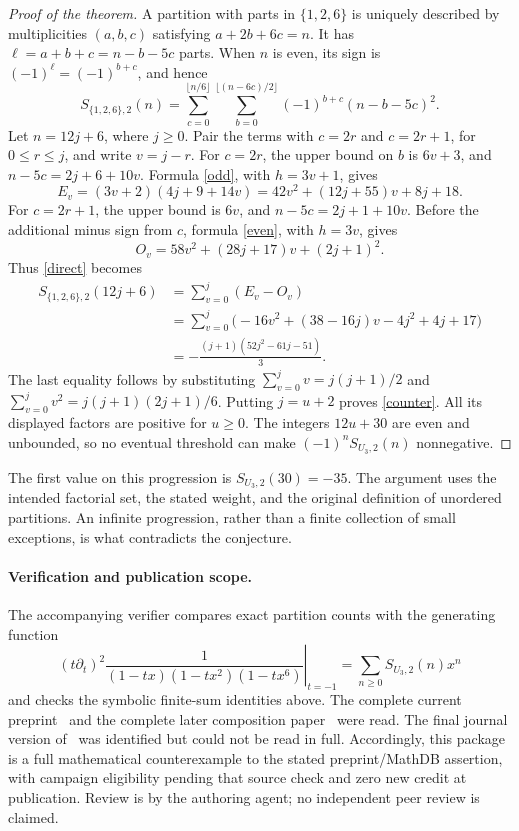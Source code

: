 \documentclass[11pt]{article}
\begin{document}
\begin{proof}[Proof of the theorem]
A partition with parts in $\{1,2,6\}$ is uniquely described by
multiplicities $(a,b,c)$ satisfying $a+2b+6c=n$. It has
$\ell=a+b+c=n-b-5c$ parts. When $n$ is even, its sign is
$(-1)^\ell=(-1)^{b+c}$, and hence
\begin{equation}\label{direct}
 S_{\{1,2,6\},2}(n)
 =\sum_{c=0}^{\lfloor n/6\rfloor}
   \sum_{b=0}^{\lfloor(n-6c)/2\rfloor}
    (-1)^{b+c}(n-b-5c)^2.
\end{equation}
Let $n=12j+6$, where $j\geq0$. Pair the terms with
$c=2r$ and $c=2r+1$, for $0\leq r\leq j$, and write $v=j-r$.
For $c=2r$, the upper bound on $b$ is $6v+3$, and
$n-5c=2j+6+10v$. Formula \eqref{odd}, with $h=3v+1$, gives
\[
 E_v=(3v+2)(4j+9+14v)
     =42v^2+(12j+55)v+8j+18.
\]
For $c=2r+1$, the upper bound is $6v$, and
$n-5c=2j+1+10v$. Before the additional minus sign from $c$,
formula \eqref{even}, with $h=3v$, gives
\[
 O_v=58v^2+(28j+17)v+(2j+1)^2.
\]
Thus \eqref{direct} becomes
\begin{align*}
 S_{\{1,2,6\},2}(12j+6)
 &=\sum_{v=0}^j(E_v-O_v)\\
 &=\sum_{v=0}^j
   \bigl(-16v^2+(38-16j)v-4j^2+4j+17\bigr)\\
 &=-\frac{(j+1)(52j^2-61j-51)}3.
\end{align*}
The last equality follows by substituting
$\sum_{v=0}^jv=j(j+1)/2$ and
$\sum_{v=0}^jv^2=j(j+1)(2j+1)/6$.
Putting $j=u+2$ proves \eqref{counter}.
All its displayed factors are positive for $u\geq0$.
The integers $12u+30$ are even and unbounded, so no eventual
threshold can make $(-1)^nS_{U_3,2}(n)$ nonnegative.
\end{proof}

The first value on this progression is $S_{U_3,2}(30)=-35$.
The argument uses the intended factorial set, the stated weight,
and the original definition of unordered partitions. An infinite
progression, rather than a finite collection of small exceptions,
is what contradicts the conjecture.

\paragraph{Verification and publication scope.}
The accompanying verifier compares exact partition counts with the
generating function
\[
 \left.(t\partial_t)^2
 \frac1{(1-tx)(1-tx^2)(1-tx^6)}\right|_{t=-1}
 =\sum_{n\geq0}S_{U_3,2}(n)x^n
\]
and checks the symbolic finite-sum identities above.
The complete current preprint~\cite{GU} and the complete later
composition paper~\cite{comp} were read. The final journal version
of~\cite{GU} was identified but could not be read in full.
Accordingly, this package is a full mathematical counterexample
to the stated preprint/MathDB assertion, with campaign eligibility
pending that source check and zero new credit at publication.
Review is by the authoring agent; no independent peer review is claimed.
\end{document}
